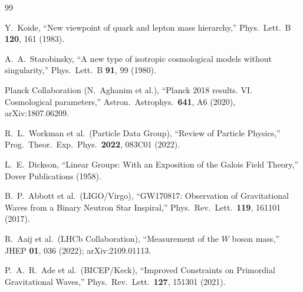 \documentclass[aps,prl,twocolumn,superscriptaddress,showpacs,floatfix]{revtex4-2}
\begin{document}
\begin{thebibliography}{99}

  Y.~Koide,
  ``New viewpoint of quark and lepton mass hierarchy,''
  Phys.\ Lett.\ B \textbf{120}, 161 (1983).

  A.~A.~Starobinsky,
  ``A new type of isotropic cosmological models without singularity,''
  Phys.\ Lett.\ B \textbf{91}, 99 (1980).

  Planck Collaboration (N.~Aghanim et al.),
  ``Planck 2018 results. VI. Cosmological parameters,''
  Astron.\ Astrophys.\ \textbf{641}, A6 (2020),
  arXiv:1807.06209.

  R.~L.~Workman et al.\ (Particle Data Group),
  ``Review of Particle Physics,''
  Prog.\ Theor.\ Exp.\ Phys.\ \textbf{2022}, 083C01 (2022).

  L.~E.~Dickson,
  ``Linear Groups: With an Exposition of the Galois Field Theory,''
  Dover Publications (1958).

  B.~P.~Abbott et al.\ (LIGO/Virgo),
  ``GW170817: Observation of Gravitational Waves from a
  Binary Neutron Star Inspiral,''
  Phys.\ Rev.\ Lett.\ \textbf{119}, 161101 (2017).

  R.~Aaij et al.\ (LHCb Collaboration),
  ``Measurement of the $W$ boson mass,''
  JHEP \textbf{01}, 036 (2022);
  arXiv:2109.01113.

  P.~A.~R.~Ade et al.\ (BICEP/Keck),
  ``Improved Constraints on Primordial Gravitational Waves,''
  Phys.\ Rev.\ Lett.\ \textbf{127}, 151301 (2021).

\end{thebibliography}
\end{document}
